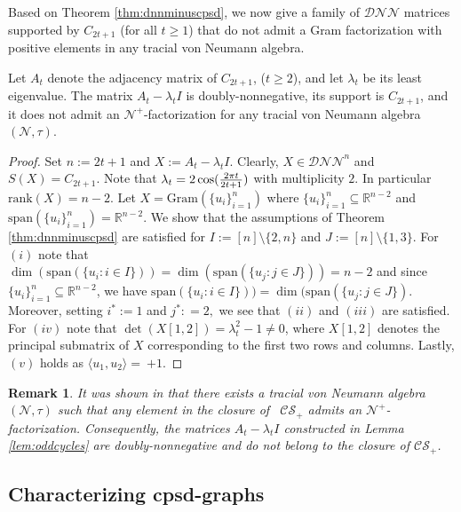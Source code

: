 \documentclass{siamart}
\newtheorem{remark}{Remark}[section]
\begin{document}
Based on  Theorem \ref{thm:dnnminuscpsd},  we now give  a family of ${\mathcal{DNN}}$ matrices supported by $C_{2t+1}$ (for all $t\ge 1$) that  do not  admit a Gram factorization  with positive elements in any   tracial  von Neumann algebra.

\medskip
\begin{lemma}\label{lem:oddcycles}
Let $A_t$ denote  the adjacency matrix of $C_{2t+1}$, {($t \geq
2$)}, and  let  $\lambda_t$ {{be its} least   eigenvalue}. The
matrix  $A_t-\lambda_t I $ is doubly-nonnegative, its support is
$C_{2t+1}$, and it does not  admit {an}
$\mathcal{N}^+$-factorization for any tracial  von Neumann
algebra~$(\mathcal{N},\tau)$.
\end{lemma}
\medskip

\begin{proof}
Set $n:=2t+1$ and $X:=A_t-\lambda_t I$. Clearly, $X\in{\mathcal{DNN}}^n$ and $S(X)=C_{2t+1}$. Note that  $\lambda_t=2\cos({2\pi t\over 2t+1})$ with  {multiplicity $2$}. In particular  ${\mathrm{rank}}(X)=n-2.$   Let $X={\mathrm{Gram}}(\{u_i\}_{i=1}^n)$ {where $\{u_i\}_{i=1}^n \subseteq {\mathbb{R}}^{n-2}$} and {${\mathrm{span}}({\{ u_i\}_{i=1}^n})={\mathbb{R}}^{n-2}$}.  We show that the assumptions  of Theorem \ref{thm:dnnminuscpsd} are
satisfied for  $I:=[n] \setminus \{ 2, n\}$ and $J:=[n] \setminus \{1,3\}$.
For $(i)$ note that {$\dim({\mathrm{span}}(\{u_i: i \in
I\}))=\dim({\mathrm{span}}(\{u_j: j \in J\}))=n-2$} and since $\{u_i\}_{i=1}^n \subseteq {\mathbb{R}}^{n-2}$,
we have ${\mathrm{span}}(\{u_i: i \in
I\}))=\dim({\mathrm{span}}(\{u_j: j \in J\})$.
 Moreover, setting    $i^*:=1$
and $j^*: = 2, $  we see that $(ii)$ and $(iii)$ are satisfied. For
$(iv)$ note that  $\det \left(X[1,2]\right)=\lambda_t^2-1\ne 0$,
{where $X[1,2]$ denotes  the principal  submatrix of $X$ corresponding  to  the first two
rows and columns}. Lastly, $(v)$ holds as ${\langle} u_1, u_2{\rangle}=~{+1}$.
\end{proof}
\medskip

\begin{remark}\label{rem:oddcycles}
It was shown  in \cite{BLP}   that there exists a tracial  von
Neumann algebra $(\mathcal{N},\tau)$ such that  any element in the
closure of \  ${\mathcal{CS}_+}$ admits {an} $\mathcal{N}^+$-factorization.
Consequently, the matrices $A_t-\lambda_t I $ constructed in Lemma
\ref{lem:oddcycles}  are doubly-nonnegative and do not belong to the
closure of ${\mathcal{CS}_+}$.
\end{remark}

\subsection{Characterizing cpsd-graphs}\label{sec:whatever}
\end{document}

